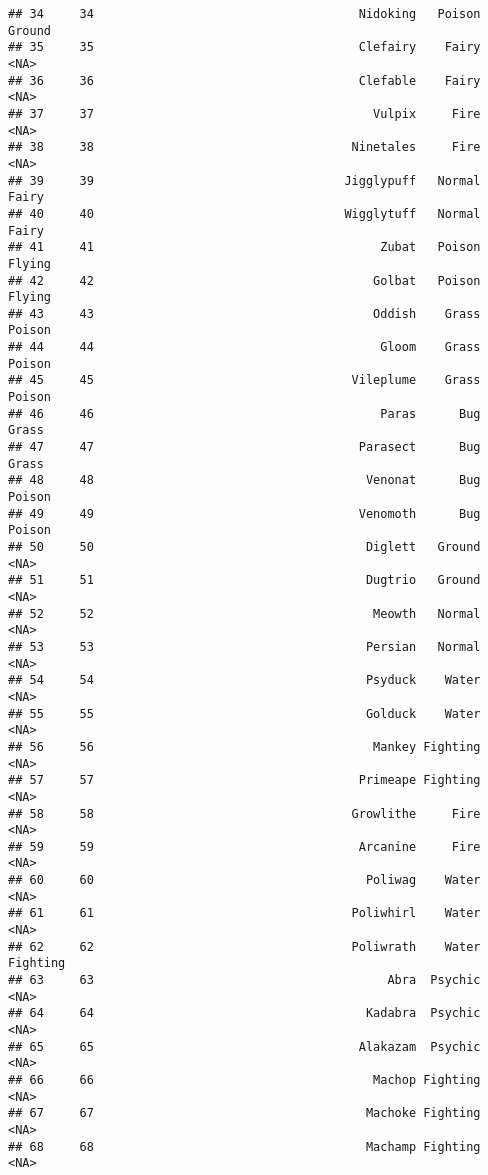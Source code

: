 \documentclass[
]{article}
\begin{document}
\begin{verbatim}
## 34     34                                     Nidoking   Poison   Ground
## 35     35                                     Clefairy    Fairy     <NA>
## 36     36                                     Clefable    Fairy     <NA>
## 37     37                                       Vulpix     Fire     <NA>
## 38     38                                    Ninetales     Fire     <NA>
## 39     39                                   Jigglypuff   Normal    Fairy
## 40     40                                   Wigglytuff   Normal    Fairy
## 41     41                                        Zubat   Poison   Flying
## 42     42                                       Golbat   Poison   Flying
## 43     43                                       Oddish    Grass   Poison
## 44     44                                        Gloom    Grass   Poison
## 45     45                                    Vileplume    Grass   Poison
## 46     46                                        Paras      Bug    Grass
## 47     47                                     Parasect      Bug    Grass
## 48     48                                      Venonat      Bug   Poison
## 49     49                                     Venomoth      Bug   Poison
## 50     50                                      Diglett   Ground     <NA>
## 51     51                                      Dugtrio   Ground     <NA>
## 52     52                                       Meowth   Normal     <NA>
## 53     53                                      Persian   Normal     <NA>
## 54     54                                      Psyduck    Water     <NA>
## 55     55                                      Golduck    Water     <NA>
## 56     56                                       Mankey Fighting     <NA>
## 57     57                                     Primeape Fighting     <NA>
## 58     58                                    Growlithe     Fire     <NA>
## 59     59                                     Arcanine     Fire     <NA>
## 60     60                                      Poliwag    Water     <NA>
## 61     61                                    Poliwhirl    Water     <NA>
## 62     62                                    Poliwrath    Water Fighting
## 63     63                                         Abra  Psychic     <NA>
## 64     64                                      Kadabra  Psychic     <NA>
## 65     65                                     Alakazam  Psychic     <NA>
## 66     66                                       Machop Fighting     <NA>
## 67     67                                      Machoke Fighting     <NA>
## 68     68                                      Machamp Fighting     <NA>

\end{verbatim}
\end{document}
